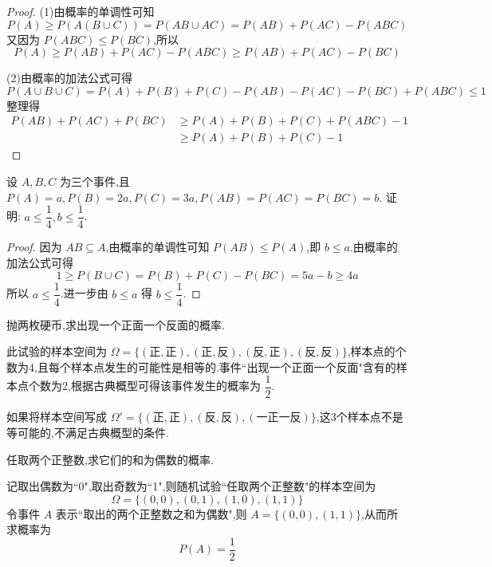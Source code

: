 \begin{proof}
    (1)由概率的单调性可知
    $$
    P(A) \geqslant P(A(B \cup C)) = P(AB \cup AC) = P(AB) + P(AC) - P(ABC)
    $$
    又因为 $P(ABC) \leqslant P(BC)$,所以
    $$
    P(A) \geqslant P(AB) + P(AC) - P(ABC) \geqslant P(AB) + P(AC) - P(BC)
    $$

    (2)由概率的加法公式可得
    $$
    P(A \cup B \cup C) = P(A) + P(B) + P(C) - P(AB) - P(AC) - P(BC) + P(ABC) \leqslant 1
    $$
    整理得
    $$
    \begin{aligned}
        P(AB) + P(AC) + P(BC) &\geqslant P(A) + P(B) + P(C) + P(ABC) - 1 \\
        & \geqslant P(A) + P(B) + P(C) - 1
    \end{aligned}
    $$
\end{proof}

\question 设 $A,B,C$ 为三个事件,且 $P(A) = a, P(B) = 2a, P(C) = 3a, P(AB) = P(AC) = P(BC) = b$. 证明: $a \leqslant \dfrac{1}{4}, b \leqslant \dfrac{1}{4}$.

\begin{proof}
    因为 $AB \subseteq A$,由概率的单调性可知 $P(AB) \leqslant P(A)$,即 $b \leqslant a$.由概率的加法公式可得
    $$
    1 \geqslant P(B \cup C) = P(B) + P(C) - P(BC) = 5a-b \geqslant 4a
    $$
    所以 $a \leqslant \dfrac{1}{4}$.进一步由 $b \leqslant a$ 得 $b \leqslant \dfrac{1}{4}$.
\end{proof}


\question 抛两枚硬币,求出现一个正面一个反面的概率.

\begin{solution}
    此试验的样本空间为 $\varOmega = \{ (\text{正}, \text{正}), (\text{正}, \text{反}), (\text{反}, \text{正}), (\text{反}, \text{反}) \}$,样本点的个数为4,且每个样本点发生的可能性是相等的.事件``出现一个正面一个反面"含有的样本点个数为2,根据古典概型可得该事件发生的概率为 $\dfrac{1}{2}$.
\end{solution}

\begin{note}
    \indent 如果将样本空间写成 $\varOmega' = \{ (\text{正}, \text{正}), (\text{反}, \text{反}), (\text{一正一反}) \}$,这3个样本点不是等可能的,不满足古典概型的条件.
\end{note}

\question 任取两个正整数,求它们的和为偶数的概率.

\begin{solution}
    记取出偶数为``0",取出奇数为``1",则随机试验``任取两个正整数"的样本空间为
    $$
    \varOmega = \{ (0,0), (0,1), (1,0), (1,1) \}
    $$
    令事件 $A$ 表示``取出的两个正整数之和为偶数",则 $A = \{ (0,0), (1,1) \}$,从而所求概率为 $$P(A) = \dfrac{1}{2}$$
\end{solution}

